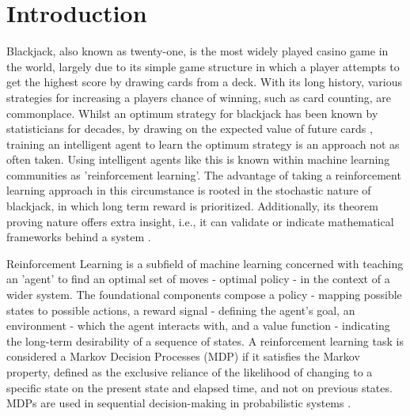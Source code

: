 \section{Introduction}

Blackjack, also known as twenty-one, is the most widely played casino game in the world, largely due to its simple game structure in which a player attempts to get the highest score by drawing cards from a deck. With its long history, various strategies for increasing a players chance of winning, such as card counting, are commonplace. Whilst an optimum strategy for blackjack has been known by statisticians for decades, by drawing on the expected value of future cards \cite{Baldwin01091956}, training an intelligent agent to learn the optimum strategy is an approach not as often taken. Using intelligent agents like this is known within machine learning communities as 'reinforcement learning'. The advantage of taking a reinforcement learning approach in this circumstance is rooted in the stochastic nature of blackjack, in which long term reward is prioritized. Additionally, its theorem proving nature offers extra insight, i.e., it can validate or indicate mathematical frameworks behind a system \cite{bidi2023reinforcementlearningcontroltheory}. 

\smallskip
Reinforcement Learning is a subfield of machine learning concerned with teaching an 'agent' to find an optimal set of moves - optimal policy - in the context of a wider system. The foundational components compose a policy - mapping possible states to possible actions, a reward signal - defining the agent's goal, an environment - which the agent interacts with, and a value function - indicating the long-term desirability of a sequence of states. A reinforcement learning task is considered a Markov Decision Processes (MDP) if it satisfies the Markov property, defined as the exclusive reliance of the likelihood of changing to a specific state on the present state and elapsed time, and not on previous states. MDPs are used in sequential decision-making in probabilistic systems \cite{10.5555/3312046}.


